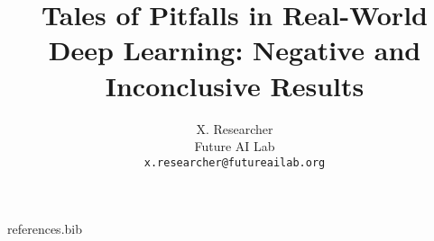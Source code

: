 \begin{filecontents}{references.bib}
\end{filecontents}

\documentclass[11pt]{article}
\usepackage[margin=1in]{geometry}
\usepackage{graphicx}
\usepackage{hyperref}

\graphicspath{{figures/}}

\title{Tales of Pitfalls in Real-World Deep Learning: Negative and Inconclusive Results}
\author{
  X. Researcher \\
  Future AI Lab \\
  \texttt{x.researcher@futureailab.org}
}
\date{}



\maketitle

\begin{abstract}
We highlight negative and inconclusive findings encountered during real-world deployments of deep learning algorithms. Despite recent advances, our experimental analyses reveal persistent challenges such as unexpected training instabilities and unresolvable performance plateaus. These results demonstrate the potential dangers of deploying models without examining subtle and potentially critical pitfalls.
\end{abstract}

\section{Introduction}
Deep learning systems have achieved considerable success on a variety of benchmark tasks, yet real-world applications often expose previously unseen vulnerabilities. Our study aims to show how unaddressed data noise, unpredictable model convergence, and fluctuating performance metrics can undermine the promises of these models in practical settings.

We focus on negative and inconclusive results that emerged while applying deep learning pipelines to large-scale tasks. Rather than highlighting novel architectures or hyperparameter tuning tricks, we discuss the stumbling blocks and partial solutions we encountered. Our contribution is an honest look at where models systematically underperform and which factors stand in the way of consistent success.

